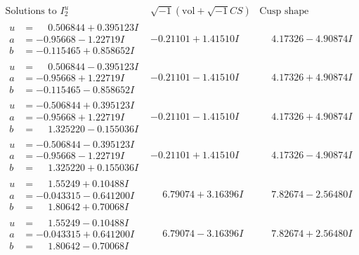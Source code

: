 \documentclass[1p]{elsarticle_modified}
\theoremstyle{definition}
\newcommand{\I}{\sqrt{-1}}
\begin{document}
$$\begin{array}{c|c|c}  
\text{Solutions to }I^u_{2}& \I (\text{vol} + \sqrt{-1}CS) & \text{Cusp shape}\\
 \hline 
\begin{aligned}
u &= \phantom{-}0.506844 + 0.395123 I \\
a &= -0.95668 - 1.22719 I \\
b &= -0.115465 + 0.858652 I\end{aligned}
 & -0.21101 + 1.41510 I & \phantom{-}4.17326 - 4.90874 I \\ \hline\begin{aligned}
u &= \phantom{-}0.506844 - 0.395123 I \\
a &= -0.95668 + 1.22719 I \\
b &= -0.115465 - 0.858652 I\end{aligned}
 & -0.21101 - 1.41510 I & \phantom{-}4.17326 + 4.90874 I \\ \hline\begin{aligned}
u &= -0.506844 + 0.395123 I \\
a &= -0.95668 + 1.22719 I \\
b &= \phantom{-}1.325220 - 0.155036 I\end{aligned}
 & -0.21101 - 1.41510 I & \phantom{-}4.17326 + 4.90874 I \\ \hline\begin{aligned}
u &= -0.506844 - 0.395123 I \\
a &= -0.95668 - 1.22719 I \\
b &= \phantom{-}1.325220 + 0.155036 I\end{aligned}
 & -0.21101 + 1.41510 I & \phantom{-}4.17326 - 4.90874 I \\ \hline\begin{aligned}
u &= \phantom{-}1.55249 + 0.10488 I \\
a &= -0.043315 - 0.641200 I \\
b &= \phantom{-}1.80642 + 0.70068 I\end{aligned}
 & \phantom{-}6.79074 + 3.16396 I & \phantom{-}7.82674 - 2.56480 I \\ \hline\begin{aligned}
u &= \phantom{-}1.55249 - 0.10488 I \\
a &= -0.043315 + 0.641200 I \\
b &= \phantom{-}1.80642 - 0.70068 I\end{aligned}
 & \phantom{-}6.79074 - 3.16396 I & \phantom{-}7.82674 + 2.56480 I \\ \hline\begin{aligned}

\end{aligned}
\end{array}$$
\end{document}
